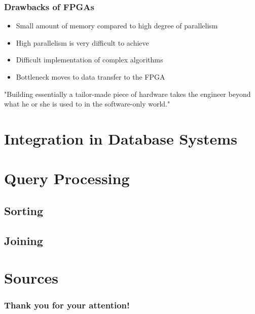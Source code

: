 \documentclass{beamer}
\begin{document}
\begin{frame}
\frametitle{Drawbacks of FPGAs}
\begin{itemize}
	\item Small amount of memory compared to high degree of parallelism
	\item High parallelism is very difficult to achieve
	\item Difficult implementation of complex algorithms
	\item Bottleneck moves to data transfer to the FPGA 
\end{itemize}
\begin{center}
	"Building essentially a tailor-made piece of hardware takes the engineer beyond what he or she is used to in the software-only world."
\end{center}

\end{frame}

\section{Integration in Database Systems}

\section{Query Processing}

\subsection{Sorting}

\subsection{Joining}

\section{Sources}

\begin{frame}
    \frametitle{Thank you for your attention!}
\end{frame}
\end{document}
